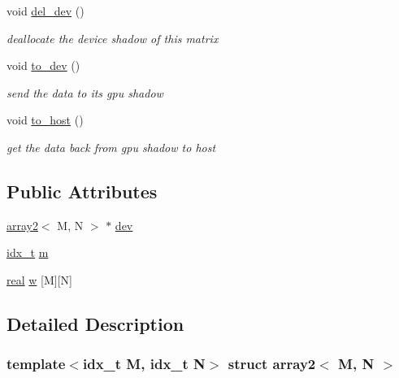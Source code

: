 \begin{DoxyCompactItemize}
\mbox{\label{structarray2_a4d3d02fcf4c468a9ca02c14583306bf3}} 
void \hyperlink{structarray2_a4d3d02fcf4c468a9ca02c14583306bf3}{del\+\_\+dev} ()
\begin{DoxyCompactList}\small\item\em deallocate the device shadow of this matrix \end{DoxyCompactList}\item 
\mbox{\label{structarray2_af77dfd8d4a5bb6b6844ec3600e01132e}} 
void \hyperlink{structarray2_af77dfd8d4a5bb6b6844ec3600e01132e}{to\+\_\+dev} ()
\begin{DoxyCompactList}\small\item\em send the data to its gpu shadow \end{DoxyCompactList}\item 
\mbox{\label{structarray2_af6ca27b12d44244e66addedeab5d6629}} 
void \hyperlink{structarray2_af6ca27b12d44244e66addedeab5d6629}{to\+\_\+host} ()
\begin{DoxyCompactList}\small\item\em get the data back from gpu shadow to host \end{DoxyCompactList}\end{DoxyCompactItemize}
\subsection*{Public Attributes}
\begin{DoxyCompactItemize}
\item 
\hyperlink{structarray2}{array2}$<$ M, N $>$ $\ast$ \hyperlink{structarray2_aedc7a89092267367178f4fcd4c9c3ead}{dev}
\item 
\hyperlink{vgg__util_8h_a8e93478a00e685bea5e6a3f617bf03a3}{idx\+\_\+t} \hyperlink{structarray2_ae14313ec7a12d47e3654d69ca47391bd}{m}
\item 
\hyperlink{vgg__util_8h_a1082d08aaa761215ec83e7149f27ad16}{real} \hyperlink{structarray2_aa68d1856f9eae6f8bd946367452501a6}{w} \mbox{[}M\mbox{]}\mbox{[}N\mbox{]}
\end{DoxyCompactItemize}


\subsection{Detailed Description}
\subsubsection*{template$<$idx\+\_\+t M, idx\+\_\+t N$>$\newline
struct array2$<$ M, N $>$}

